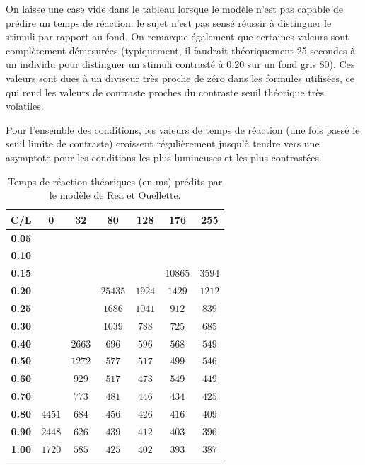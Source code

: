 	\par On laisse une case vide dans le tableau lorsque le modèle n'est pas capable de prédire un temps de réaction: le sujet n'est pas sensé réussir à distinguer le stimuli par rapport au fond. On remarque également que certaines valeurs sont complètement démesurées (typiquement, il faudrait théoriquement 25 secondes à un individu pour distinguer un stimuli contrasté à 0.20 sur un fond gris 80). Ces valeurs sont dues à un diviseur très proche de zéro dans les formules utilisées, ce qui rend les valeurs de contraste proches du contraste seuil théorique très volatiles.
	
	\par Pour l'ensemble des conditions, les valeurs de temps de réaction (une fois passé le seuil limite de contraste) croissent régulièrement jusqu'à tendre vers une asymptote pour les conditions les plus lumineuses et les plus contrastées.
	
	\begin{table}[h]	
		\centering
		\caption{Temps de réaction théoriques (en ms) prédits par le modèle de Rea et Ouellette.}
		\label{tab:theoretical_reaction_times}
		\begin{tabular}{c|cccccc}
			\textbf{C/L} & \textbf{0} & \textbf{32} & \textbf{80} & \textbf{128} & \textbf{176} & \textbf{255}\\
			\hline
			\textbf{0.05}\\
			\textbf{0.10}\\
			\textbf{0.15} &  &  &  &  & $10865$ & $3594$\\
			\textbf{0.20} &  &  & $25435$ & $1924$ & $1429$ & $1212$\\
			\textbf{0.25} &  &  & $1686$ & $1041$ & $912$ & $839$\\
			\textbf{0.30} &  &  & $1039$ & $788$ & $725$ & $685$\\
			\textbf{0.40} &  & $2663$ & $696$ & $596$ & $568$ & $549$\\
			\textbf{0.50} &  & $1272$ & $577$ & $517$ & $499$ & $546$\\
			\textbf{0.60} &  & $929$ & $517$ & $473$ & $549$ & $449$\\
			\textbf{0.70} &  & $773$ & $481$ & $446$ & $434$ & $425$\\
			\textbf{0.80} & $4451$ & $684$ & $456$ & $426$ & $416$ & $409$\\
			\textbf{0.90} & $2448$ & $626$ & $439$ & $412$ & $403$ & $396$\\
			\textbf{1.00} & $1720$ & $585$ & $425$ & $402$ & $393$ & $387$\\
		\end{tabular}
	\end{table}
	
